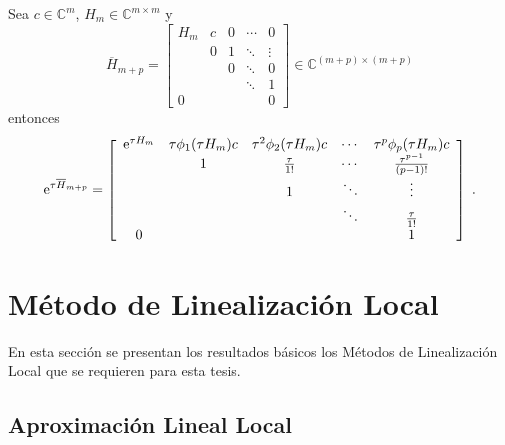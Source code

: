\begin{theorem}\label{exp-phi}
    \cite{sidje1998expokit} Sea $c\in\mathbb{C}^{m}$, $H_m\in\mathbb{C}^{m\times m}$ y 
    \begin{equation}
    \overline{H}_{m+p} = \left[\begin{array}{ccccc}
    H_m & c & 0 & \cdots & 0 \\
          & 0 & 1 & \ddots & \vdots \\
          &   & 0 & \ddots & 0 \\
          &   &   & \ddots & 1 \\
       0  &   &   &        & 0
    \end{array}\right]\in \mathbb{C}^{(m+p)\times(m+p)}
    \end{equation}
    entonces
     \begin{equation}
    \mathrm{e}^{\tau\overline{H}_{m+p}} = \left[\begin{array}{ccccc}
    \mathrm{e}^{\tau H_m} & \tau\phi_1(\tau H_m)c & \tau^{2}\phi_2(\tau H_m)c & \cdots & \tau^{p}\phi_p(\tau H_m)c \\
      & 1 & \frac{\tau}{1!} & \cdots & \frac{\tau^{p-1}}{(p-1)!} \\
      &   & 1 & \ddots & \vdots \\
      &   &   & \ddots & \frac{\tau}{1!} \\
    0 &   &   &        & 1
    \end{array}\right]  \;.
    \end{equation}
\end{theorem} 


\section{Método de Linealización Local}
En esta sección se presentan los resultados básicos los Métodos de Linealización Local que se requieren para esta tesis.

\subsection{Aproximación Lineal Local}

